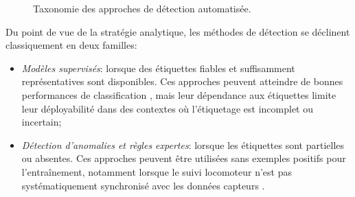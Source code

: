 \begin{figure}[H]
{%
    }
    \caption{Taxonomie des approches de détection automatisée.}
    \label{fig:taxonomie_approches}
\end{figure}

Du point de vue de la stratégie analytique, les méthodes de détection se déclinent
classiquement en deux familles:
\begin{itemize}
    \item[(a)] \textit{Modèles supervisés}: lorsque des étiquettes fiables et suffisamment
    représentatives sont disponibles. Ces approches peuvent atteindre de bonnes performances
    de classification
    \citep{vanhertem2014evaluation,viazzi2013analysis}, mais leur
    dépendance aux étiquettes limite leur déployabilité dans des contextes où l'étiquetage est
    incomplet ou incertain;
    \item[(b)] \textit{Détection d'anomalies et règles expertes}: lorsque les étiquettes sont
    partielles ou absentes. Ces approches peuvent être utilisées sans exemples positifs pour
    l'entraînement, notamment lorsque le suivi locomoteur n'est pas systématiquement
    synchronisé avec les données capteurs
    \citep{qiao2021review,oleary2020accelerometers}.
\end{itemize}

